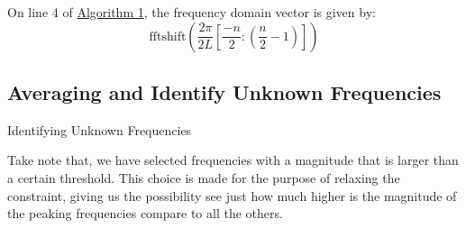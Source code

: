 \documentclass{article}
\begin{document}
    On line 4 of \hyperref[alg:setup]{Algorithm 1}, the frequency domain vector is given by: 
    \begin{equation}
        \text{fftshift}\left(
            \frac{2\pi}{2L}
            \left[
                \frac{-n}{2}:\left(\frac{n}{2} - 1\right)
            \right]
            \right)
    \end{equation}

\subsection{Averaging and Identify Unknown Frequencies}
    \begin{algorithm}\small
        \begin{algorithmic}[1]\label{alg:average}
            {
            }
            \ENDFOR
        \end{algorithmic}
        \caption{Identifying Unknown Frequencies}
    \end{algorithm}

    Take note that, we have selected frequencies with a magnitude that is larger than a certain threshold. This choice is made for the purpose of relaxing the constraint, giving us the possibility see just how much higher is the magnitude of the peaking frequencies compare to all the others.
\end{document}
